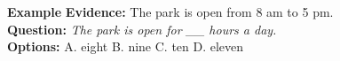 \begin{block}{{\color{mLightGreen}\textbf{Example}} }
  \mAlertSpace
  \textbf{Evidence:} The park is open from 8 am to 5 pm. \\
  \textbf{Question:} \textit{The park is open for \_\_ hours a day.} \\
  \textbf{Options:} A. eight B. {\color{mLightGreen} nine} C. ten D. eleven
\end{block}
